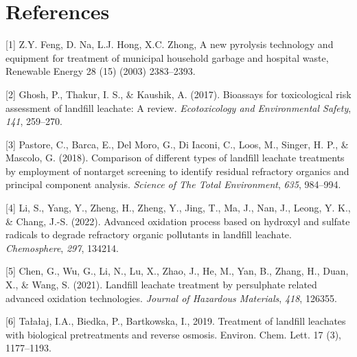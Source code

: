 \documentclass[a4paper]{article}
\begin{document}
\section{References}

{[}1{]} Z.Y. Feng, D. Na, L.J. Hong, X.C. Zhong, A new pyrolysis
technology and equipment for treatment of municipal household garbage
and hospital waste, Renewable Energy 28 (15) (2003) 2383--2393.

{[}2{]} Ghosh, P., Thakur, I. S., \& Kaushik, A. (2017). Bioassays for
toxicological risk assessment of landfill leachate: A review.
\emph{Ecotoxicology and Environmental Safety}, \emph{141}, 259--270.

{[}3{]} Pastore, C., Barca, E., Del Moro, G., Di Iaconi, C., Loos, M.,
Singer, H. P., \& Mascolo, G. (2018). Comparison of different types of
landfill leachate treatments by employment of nontarget screening to
identify residual refractory organics and principal component analysis.
\emph{Science of The Total Environment}, \emph{635}, 984--994.

{[}4{]} Li, S., Yang, Y., Zheng, H., Zheng, Y., Jing, T., Ma, J., Nan,
J., Leong, Y. K., \& Chang, J.-S. (2022). Advanced oxidation process
based on hydroxyl and sulfate radicals to degrade refractory organic
pollutants in landfill leachate. \emph{Chemosphere}, \emph{297}, 134214.

{[}5{]} Chen, G., Wu, G., Li, N., Lu, X., Zhao, J., He, M., Yan, B.,
Zhang, H., Duan, X., \& Wang, S. (2021). Landfill leachate treatment by
persulphate related advanced oxidation technologies. \emph{Journal of
Hazardous Materials}, \emph{418}, 126355.

{[}6{]} Tałałaj, I.A., Biedka, P., Bartkowska, I., 2019. Treatment of
landfill leachates with biological pretreatments and reverse osmosis.
Environ. Chem. Lett. 17 (3), 1177--1193.
\end{document}
